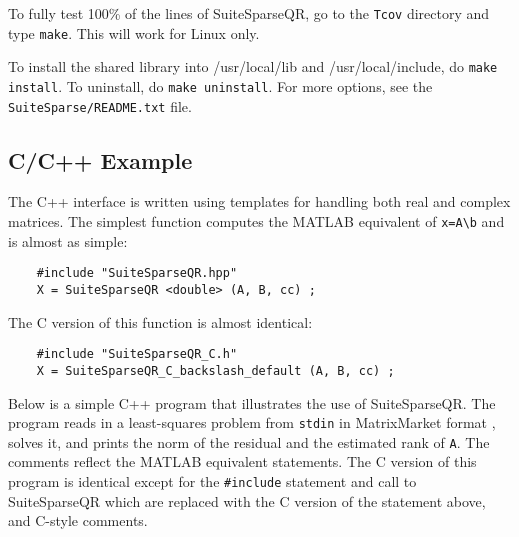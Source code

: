 \documentclass[12pt]{article}
\begin{document}
To fully test 100\% of the lines of SuiteSparseQR, go to the \verb'Tcov'
directory and type \verb'make'.  This will work for Linux only.

To install the shared library
into /usr/local/lib and /usr/local/include, do {\tt make install}.
To uninstall, do {\tt make uninstall}.
For more options, see the {\tt SuiteSparse/README.txt} file.

\subsection{C/C++ Example}

The C++ interface is written using templates for handling both real and complex
matrices.  The simplest function computes the MATLAB equivalent of
\verb'x=A\b' and is almost as simple:
{\footnotesize
\begin{verbatim}
    #include "SuiteSparseQR.hpp"
    X = SuiteSparseQR <double> (A, B, cc) ;
\end{verbatim}
}
The C version of this function is almost identical:
{\footnotesize
\begin{verbatim}
    #include "SuiteSparseQR_C.h"
    X = SuiteSparseQR_C_backslash_default (A, B, cc) ;
\end{verbatim}
}

Below is a simple C++ program that illustrates the use of SuiteSparseQR.  The
program reads in a least-squares problem from \verb'stdin' in MatrixMarket
format \cite{BoisvertPozoRemingtonBarrettDongarra97}, solves it, and prints the
norm of the residual and the estimated rank of \verb'A'.  The comments reflect
the MATLAB equivalent statements.  The C version of this program is identical
except for the \verb'#include' statement and call to SuiteSparseQR which are
replaced with the C version of the statement above, and C-style comments.
\end{document}
